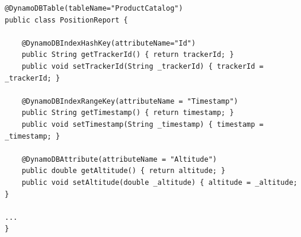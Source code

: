 \begin{lstlisting}
@DynamoDBTable(tableName="ProductCatalog")
public class PositionReport {

    @DynamoDBIndexHashKey(attributeName="Id")
    public String getTrackerId() { return trackerId; }
    public void setTrackerId(String _trackerId) { trackerId = _trackerId; }

    @DynamoDBIndexRangeKey(attributeName = "Timestamp")
    public String getTimestamp() { return timestamp; }
    public void setTimestamp(String _timestamp) { timestamp = _timestamp; }

    @DynamoDBAttribute(attributeName = "Altitude")
    public double getAltitude() { return altitude; }
    public void setAltitude(double _altitude) { altitude = _altitude; }

...
}
\end{lstlisting}
















